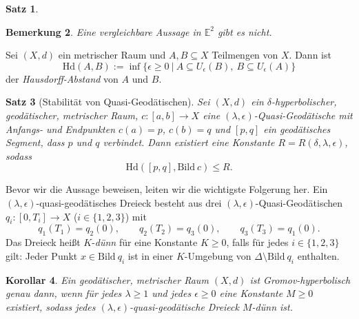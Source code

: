 \documentclass[11pt]{book}
\numberwithin{dummy}{section}
\newtheorem{theorem}{Satz}[section]
\newtheorem{corollary}[theorem]{Korollar}
\newtheorem{remark}[theorem]{Bemerkung}
\theoremstyle{nonumberbreak}
\newenvironment{defin}[1][]{\ifthenelse{\equal{#1}{}}{\definition}{\definition[#1]}\rm}{\enddefinition}
\newenvironment{pr}[1][]{\ifthenelse{\equal{#1}{}}{\proof}{\proof[#1]}\rm}{\endproof}
\newcommand{\E}{\mathbb{E}}
\newcommand{\la}{\longrightarrow}
\begin{document}
\begin{spacing}{1.4}
\begin{theorem}
\begin{pr}
\end{pr}

\end{theorem}



\begin{remark}
Eine vergleichbare Aussage in $\E^2$ gibt es nicht.
\end{remark}


\begin{defin}
Sei $(X,d)$ ein metrischer Raum und $A,B \subseteq X$ Teilmengen von $X$. Dann ist 
$$\mathrm{Hd}(A,B) := \inf \{ \epsilon \geqslant 0  \ \vert \ A \subseteq U_{\epsilon}(B), \ B \subseteq U_{\epsilon}(A) \}$$
der \textit{Hausdorff-Abstand} von $A$ und $B$.
\end{defin}


\begin{theorem}[Stabilität von Quasi-Geodätischen]    %
Sei $(X,d)$ ein $\delta$-hyperbolischer, geodätischer, metrischer Raum, $c:[a,b] \la X$ eine $(\lambda, \epsilon)$-Quasi-Geodätische mit Anfangs- und Endpunkten $c(a)=p$, $c(b)=q$ und $[p,q]$ ein geodätisches Segment, dass $p$ und $q$ verbindet. Dann existiert eine Konstante $R=R(\delta, \lambda, \epsilon)$, sodass
$$\mathrm{Hd}([p,q], \mathrm{Bild} \ c) \leqslant R.$$
\end{theorem}




Bevor wir die Aussage beweisen, leiten wir die wichtigste Folgerung her. Ein $(\lambda, \epsilon)$-quasi-geodätisches Dreieck besteht aus drei $(\lambda, \epsilon)$-Quasi-Geodätischen $q_i: [0,T_i] \la X$ ($i \in \{1,2,3\}$) mit 
$$q_1(T_1) = q_2(0), \qquad q_2(T_2) = q_3(0), \qquad q_3(T_3) = q_1(0).$$
Das Dreieck heißt $K$-\textit{dünn} für eine Konstante $K \geqslant 0$, falls für jedes $i \in \{1,2,3\}$ gilt: Jeder Punkt $x \in \mathrm{Bild} \ q_i$ ist in einer $K$-Umgebung von $ \Delta \setminus\mathrm{Bild} \ q_{i}$ enthalten.



\begin{corollary}   %
Ein geodätischer, metrischer Raum $(X,d)$ ist Gromov-hyperbolisch genau dann, wenn für jedes $\lambda \geqslant 1$ und jedes $\epsilon \geqslant 0$ eine Konstante $M \geqslant 0$ existiert, sodass jedes $(\lambda, \epsilon)$-quasi-geodätische Dreieck $M$-dünn ist.


\end{corollary}




\end{spacing}
\end{document}
